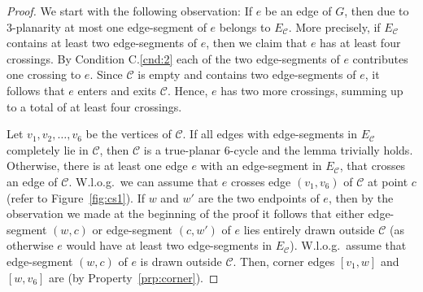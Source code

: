 \begin{proof}
We start with the following observation: If $e$ be an edge of $G$, then due to $3$-planarity at most one edge-segment of $e$ belongs to $E_{\mathcal{C}}$. More precisely, if $E_{\mathcal{C}}$ contains at least two edge-segments of $e$, then we claim that $e$ has at least four crossings. By Condition C.\ref{cnd:2} each of the two edge-segments of $e$ contributes one crossing to $e$. Since $\mathcal{C}$ is empty and contains two edge-segments of $e$, it follows that $e$ enters and exits $\mathcal{C}$. Hence, $e$ has two more crossings, summing up to a total of at least four crossings. 

Let $v_1,v_2,\dots,v_6$ be the vertices of $\mathcal{C}$. If all edges with edge-segments in $E_{\mathcal{C}}$ completely lie in $\mathcal{C}$,  then $\mathcal{C}$ is a true-planar $6$-cycle and the lemma trivially holds. Otherwise, there is at least one edge $e$ with an edge-segment in $E_{\mathcal{C}}$, that crosses an edge of $\mathcal{C}$. W.l.o.g.~we can assume that $e$ crosses edge $(v_1,v_6)$ of $\mathcal{C}$ at point $c$ (refer to Figure~\ref{fig:cs1}). If $w$ and $w'$ are the two endpoints of $e$, then by the observation we made at the beginning of the proof it follows that either edge-segment $(w,c)$ or edge-segment $(c,w')$ of $e$ lies entirely drawn outside $\mathcal{C}$ (as otherwise $e$ would have at least two edge-segments in $E_{\mathcal{C}}$). W.l.o.g.~assume that edge-segment $(w,c)$ of $e$ is drawn outside $\mathcal{C}$. Then, corner edges $[v_1,w]$ and $[w,v_6]$ are \pes (by Property~\ref{prp:corner}). 


\end{proof}

